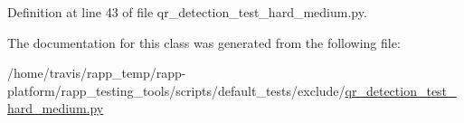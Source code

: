 Definition at line 43 of file qr\-\_\-detection\-\_\-test\-\_\-hard\-\_\-medium.\-py.



The documentation for this class was generated from the following file\-:\begin{DoxyCompactItemize}
\item 
/home/travis/rapp\-\_\-temp/rapp-\/platform/rapp\-\_\-testing\-\_\-tools/scripts/default\-\_\-tests/exclude/\hyperlink{qr__detection__test__hard__medium_8py}{qr\-\_\-detection\-\_\-test\-\_\-hard\-\_\-medium.\-py}\end{DoxyCompactItemize}
